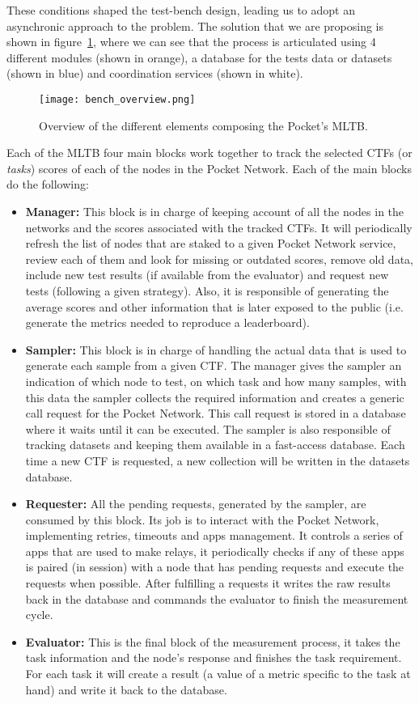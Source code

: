 These conditions shaped the test-bench design, leading us to adopt an asynchronic approach to the problem. The solution that we are proposing is shown in figure~\ref{fig:bench_overview}, where we can see that the process is articulated using 4 different modules (shown in orange), a database for the tests data or datasets (shown in blue) and coordination services (shown in white).
\begin{figure}[H]
    \centering
    \texttt{[image: bench\_overview.png]}
    \caption{Overview of the different elements composing the Pocket's \gls{MLTB}.}
    \label{fig:bench_overview}
\end{figure}
Each of the \gls{MLTB} four main blocks work together to track the selected \glspl{CTF} (or \emph{tasks}) scores of each of the nodes in the Pocket Network. Each of the main blocks do the following:
\begin{itemize}
    \item \textbf{Manager:} This block is in charge of keeping account of all the nodes in the networks and the scores associated with the tracked \glspl{CTF}. It will periodically refresh the list of nodes that are staked to a given Pocket Network service, review each of them and look for missing or outdated scores, remove old data, include new test results (if available from the evaluator) and request new tests (following a given strategy). Also, it is responsible of generating the average scores and other information that is later exposed to the public (i.e. generate the metrics needed to reproduce a leaderboard).
    \item \textbf{Sampler:} This block is in charge of handling the actual data that is used to generate each sample from a given \gls{CTF}. The manager gives the sampler an indication of which node to test, on which task and how many samples, with this data the sampler collects the required information and creates a generic call request for the Pocket Network. This call request is stored in a database where it waits until it can be executed. The sampler is also responsible of tracking datasets and keeping them available in a fast-access database. Each time a new \gls{CTF} is requested, a new collection will be written in the datasets database.
    \item \textbf{Requester:} All the pending requests, generated by the sampler, are consumed by this block. Its job is to interact with the Pocket Network, implementing retries, timeouts and apps management. It controls a series of apps that are used to make relays, it periodically checks if any of these apps is paired (in session) with a node that has pending requests and execute the requests when possible. After fulfilling a requests it writes the raw results back in the database and commands the evaluator to finish the measurement cycle. 
    \item \textbf{Evaluator:} This is the final block of the measurement process, it takes the task information and the node's response and finishes the task requirement. For each task it will create a result (a value of a metric specific to the task at hand) and write it back to the database.
\end{itemize}

